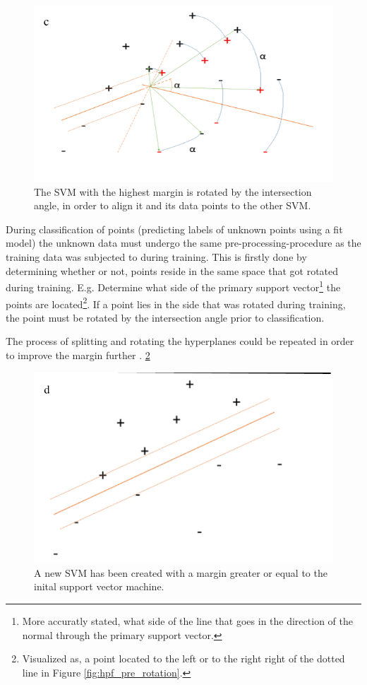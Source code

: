 \documentclass[a4paper,twoside]{bth}
\begin{document}
\begin{figure}
\centering
\includegraphics[scale=0.7]{images/intro-images/hpf_3.png}
   \caption{The SVM with the highest margin is rotated by the intersection angle, in order to align it and its data points to the other SVM. }
   \label{hpf_3}
\end{figure}
\par During classification of points (predicting labels of unknown points using a fit model) the unknown data must undergo the same pre-processing-procedure as the training data was subjected to during training. This is firstly done by determining whether or not, points reside in the same space that got rotated during training. E.g. Determine what side of the primary support vector\footnote{More accuratly stated, what side of the line that goes in the direction of the normal through the primary support vector.} the points are located\footnote{Visualized as, a point located to the left or to the right right of the dotted line in Figure \ref{fig:hpf_pre_rotation}.}. If a point lies in the side that was rotated during training, the point must be rotated by the intersection angle prior to classification. 

\par The process of splitting and rotating the hyperplanes could be repeated in order to improve the margin further \cite{unpublished}.
\ref{hpf_4}
\begin{figure}
\centering
\includegraphics[scale=0.7]{images/intro-images/hpf_4.png}
   \caption{A new SVM has been created with a margin greater or equal to the inital support vector machine.}
   \label{hpf_4}
\end{figure}
\end{document}
